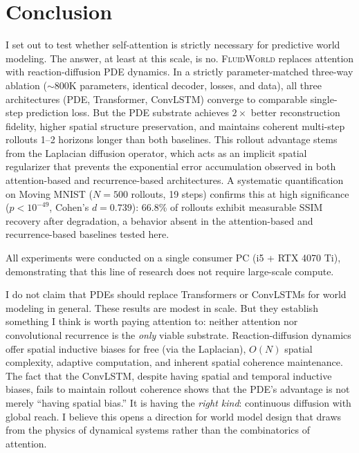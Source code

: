\documentclass{article}
\newcommand{\fluidworld}{\textsc{FluidWorld}}
\begin{document}
\section{Conclusion}
\label{sec:conclusion}

I set out to test whether self-attention is strictly necessary for predictive world modeling. The answer, at least at this scale, is no. \fluidworld{} replaces attention with reaction-diffusion PDE dynamics. In a strictly parameter-matched three-way ablation ($\sim$800K parameters, identical decoder, losses, and data), all three architectures (PDE, Transformer, ConvLSTM) converge to comparable single-step prediction loss. But the PDE substrate achieves $2\times$ better reconstruction fidelity, higher spatial structure preservation, and maintains coherent multi-step rollouts 1--2 horizons longer than both baselines. This rollout advantage stems from the Laplacian diffusion operator, which acts as an implicit spatial regularizer that prevents the exponential error accumulation observed in both attention-based and recurrence-based architectures. A systematic quantification on Moving MNIST ($N\!=\!500$ rollouts, 19 steps) confirms this at high significance ($p < 10^{-49}$, Cohen's $d\!=\!0.739$): 66.8\% of rollouts exhibit measurable SSIM recovery after degradation, a behavior absent in the attention-based and recurrence-based baselines tested here.

All experiments were conducted on a single consumer PC (i5 + RTX 4070 Ti), demonstrating that this line of research does not require large-scale compute.

I do not claim that PDEs should replace Transformers or ConvLSTMs for world modeling in general. These results are modest in scale. But they establish something I think is worth paying attention to: neither attention nor convolutional recurrence is the \emph{only} viable substrate. Reaction-diffusion dynamics offer spatial inductive biases for free (via the Laplacian), $O(N)$ spatial complexity, adaptive computation, and inherent spatial coherence maintenance. The fact that the ConvLSTM, despite having spatial and temporal inductive biases, fails to maintain rollout coherence shows that the PDE's advantage is not merely ``having spatial bias.'' It is having the \emph{right kind}: continuous diffusion with global reach. I believe this opens a direction for world model design that draws from the physics of dynamical systems rather than the combinatorics of attention.
\end{document}
